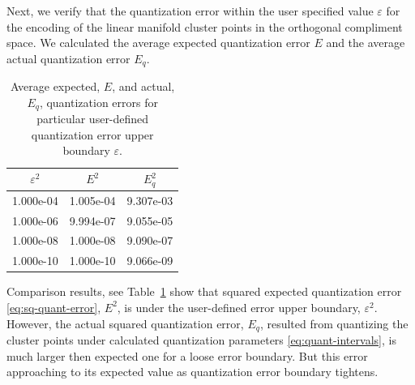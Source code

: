 Next, we verify that the quantization error within the user specified value
$\varepsilon$ for the encoding of the linear manifold cluster points in
the orthogonal compliment space. We calculated the average expected quantization
error $E$ and the average actual quantization error $E_q$.




\begin{table}[h]
\center
\begin{tabular}{ccc}
$\varepsilon^2$ & $E^2$ & $E_q^2$ \\
\hline
1.000e-04 & 1.005e-04 & 9.307e-03 \\
1.000e-06 & 9.994e-07 & 9.055e-05 \\
1.000e-08 & 1.000e-08 & 9.090e-07 \\
1.000e-10 & 1.000e-10 & 9.066e-09 \\



\end{tabular}
\caption{Average expected, $E$, and actual, $E_q$, quantization errors for
particular user-defined quantization error upper boundary $\varepsilon$.}
\label{tbl:quant-error}
\end{table}

Comparison results, see Table~\ref{tbl:quant-error} show that squared expected
quantization error \eqref{eq:sq-quant-error}, $E^2$, is under the user-defined
error upper boundary, $\varepsilon^2$. However, the actual squared quantization
error, $E_q$, resulted from quantizing the cluster points under calculated
quantization parameters \eqref{eq:quant-intervals}, is much larger then
expected one for a loose error boundary. But this error approaching to
its expected value as quantization error boundary tightens.
